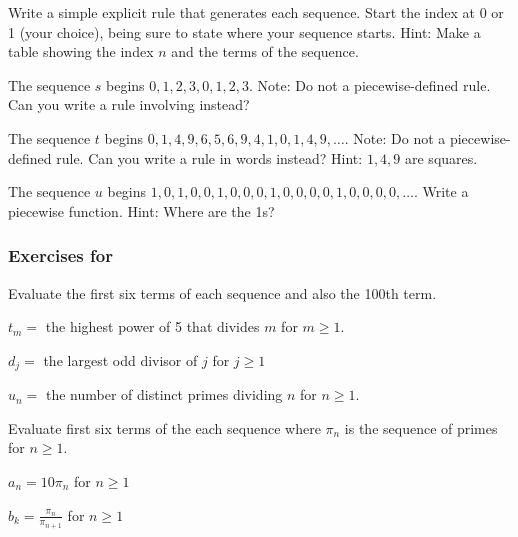 \begin{exer}[\exerE]
\label{exer_NTE_number_theoretic}
    Write a simple explicit rule that generates each sequence.  Start the index at 0 or 1 (your choice), being sure to state where your sequence starts.  Hint: Make a table showing the index $n$ and the terms of the sequence.
        \begin{exerpart}
            \item The sequence $s$ begins $0,1,2,3,0,1,2,3$.  Note: Do not a piecewise-defined rule. Can you write a rule involving  instead?
            \item The sequence $t$ begins $0,1,4,9,6,5,6,9,4,1,0,1,4,9, \ldots$.  Note: Do not a piecewise-defined rule. Can you write a rule in words instead? Hint: $1,4,9$ are squares.
            \item The sequence $u$ begins $1,0,1,0,0,1,0,0,0,1,0,0,0,0,1,0,0,0,0,\ldots$. Write a piecewise function. Hint: Where are the 1s?
        \end{exerpart}
\end{exer}


\subsubsection*{Exercises for  \subseqprimes}

\begin{exer}[\exerP] %
\label{exer_eval_seq_prime_fact}
    Evaluate the first six terms of each sequence and also the 100th term. 
        \begin{exerpart}
            \item $t_m=$ the highest power of 5 that divides $m$ for $m \ge 1$.
            \item $d_j=$ the largest odd divisor of $j$ for $j \ge 1$
            \item $u_n=$ the number of distinct primes dividing $n$ for $n \ge 1$.
        \end{exerpart}
\end{exer}

\begin{exer}[\exerP] %
\label{exer_eval_seq_involving_pisubn}
    Evaluate first six terms of the each sequence where $\pi_n$ is the sequence of primes for $n \ge 1$.
        \begin{exerpart}
            \item $a_n=10\pi_n$ for $n \ge 1$
            \item $b_k=\frac{\pi_n}{\pi_{n+1}}$ for $n \ge 1$
        \end{exerpart}
\end{exer}

